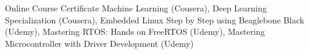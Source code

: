 

\begin{cvskills}

  \cvskill
    {Online Course Certificate} %
    {Machine Learning (Cousera), 
    Deep Learning Specialization (Cousera), 
    Embedded Linux Step by \newline Step using Beaglebone Black (Udemy), 
    Mastering RTOS: Hands on FreeRTOS (Udemy), 
    Mastering \newline Microcontroller with Driver Development (Udemy)} %


\end{cvskills}
